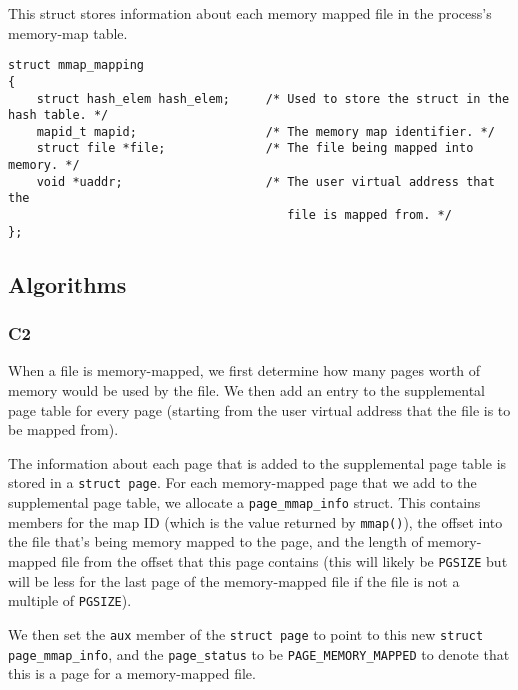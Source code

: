 \documentclass[a4wide, 11pt]{article}
\newcommand{\tx}{\texttt}
\begin{document}
This struct stores information about each memory mapped file in the process's memory-map table.
\begin{verbatim}
struct mmap_mapping
{
    struct hash_elem hash_elem;     /* Used to store the struct in the hash table. */
    mapid_t mapid;                  /* The memory map identifier. */
    struct file *file;              /* The file being mapped into memory. */
    void *uaddr;                    /* The user virtual address that the
                                       file is mapped from. */
};
\end{verbatim}

\subsection{Algorithms}
\subsubsection{C2}

When a file is memory-mapped, we first determine how many pages worth of memory would be used by the file. We then add an entry to the supplemental page table for every page (starting from the user virtual address that the file is to be mapped from).

The information about each page that is added to the supplemental page table is stored in a \tx{struct page}. For each memory-mapped page that we add to the supplemental page table, we allocate a \tx{page\_mmap\_info} struct. This contains members for the map ID (which is the value returned by \tx{mmap()}), the offset into the file that's being memory mapped to the page, and the length of memory-mapped file from the offset that this page contains (this will likely be \tx{PGSIZE} but will be less for the last page of the memory-mapped file if the file is not a multiple of \tx{PGSIZE}).

We then set the \tx{aux} member of the \tx{struct page} to point to this new \tx{struct page\_mmap\_info}, and the \tx{page\_status} to be \tx{PAGE\_MEMORY\_MAPPED} to denote that this is a page for a memory-mapped file.
\end{document}
